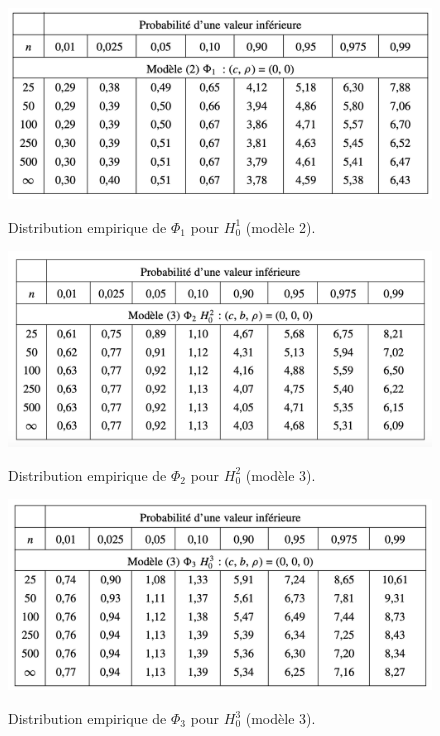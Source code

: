 \begin{figure}[H]
    \centering
    \caption{Distribution empirique de $\Phi_1$ pour $H_0^1$ (modèle 2).}
    \includegraphics[scale=0.8]{annexes/dfvalues1.png}
    \label{fig:tabledf1}
\end{figure}

\begin{figure}[H]
    \centering
    \caption{Distribution empirique de $\Phi_2$ pour $H_0^2$ (modèle 3).}
    \includegraphics[scale=0.8]{annexes/dfvalues2.png}
    \label{fig:tabledf2}
\end{figure}

\begin{figure}[H]
    \centering
    \caption{Distribution empirique de $\Phi_3$ pour $H_0^3$ (modèle 3).}
    \includegraphics[scale=0.8]{annexes/dfvalues3.png}
    \label{fig:tabledf3}
\end{figure}

